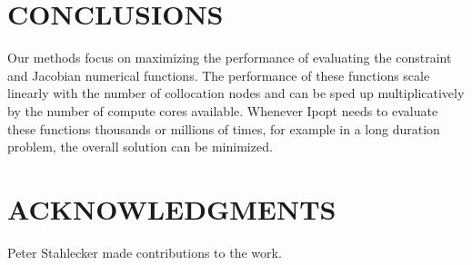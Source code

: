 \documentclass[11pt,twocolumn]{article}
\begin{document}
\vspace{-1em}
\section*{CONCLUSIONS}
\vspace{-1em}
%
Our methods focus on maximizing the performance of evaluating the constraint
and Jacobian numerical functions. The performance of these functions scale
linearly with the number of collocation nodes and can be sped up
multiplicatively by the number of compute cores available. Whenever Ipopt needs
to evaluate these functions thousands or millions of times, for example in a
long duration problem, the overall solution can be minimized.

\vspace{-1em}



\vspace{-1em}
\section*{ACKNOWLEDGMENTS}
\vspace{-1em}
%
Peter Stahlecker made contributions to the work.
\end{document}
